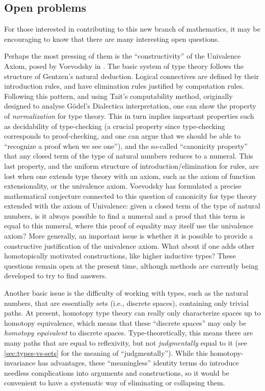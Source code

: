 \subsection*{Open problems} 

For those interested in contributing to this new branch of mathematics, it may be encouraging to know that there are many interesting open questions.

%
Perhaps the most pressing of them is the ``constructivity'' of the Univalence Axiom, posed by Voevodsky in \cite{Universe-poly}.
The basic system of type theory follows the structure of Gentzen's natural deduction. Logical connectives are defined by their introduction rules, and have elimination rules justified by computation rules. Following this pattern, and using Tait's computability method, originally designed to analyse G\"odel's Dialectica interpretation, one can show the property of \emph{normalization} for type theory. This in turn implies important properties such as decidability of type-checking (a crucial property since type-checking corresponds to proof-checking, and one can argue that we should be able to ``recognize a proof when we see one''), and the so-called ``canonicity property'' that any closed term of the type of natural numbers reduces to a numeral. This last property, and the uniform structure of introduction/elimination for rules, are lost when one extends type theory with an axiom, such as the axiom of function extensionality, or the univalence axiom. Voevodsky has formulated a precise mathematical conjecture connected to this question of canonicity for type theory extended with the axiom of Univalence: given a closed term of the type of natural numbers, is it always possible to find a numeral and a proof that this term is equal to this numeral, where this proof of equality may itself use the univalence axiom? More generally, an important issue is whether it is possible to provide a constructive justification of the univalence axiom.
What about if one adds other homotopically motivated constructions, like higher inductive types?
These questions remain open at the present time, although methods are currently being developed to try to find answers.

Another basic issue is the difficulty of working with types, such as the natural numbers, that are essentially sets (i.e., discrete spaces), containing only trivial paths.
At present, homotopy type theory can really only characterize spaces up to homotopy equivalence, which means that these ``discrete spaces'' may only be \emph{homotopy equivalent} to discrete spaces.
Type-theoretically, this means there are many paths that are equal to reflexivity, but not \emph{judgmentally} equal to it (see \cref{sec:types-vs-sets} for the meaning of ``judgmentally'').
While this homotopy-invariance has advantages, these ``meaningless'' identity terms do introduce needless complications into arguments and constructions, so it would be convenient to have a systematic way of eliminating or collapsing them.

